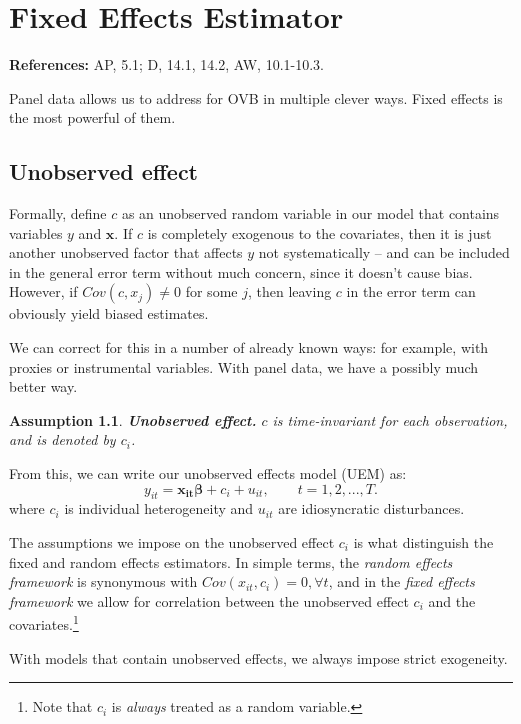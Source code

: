 \documentclass[11pt, a4paper]{report}
\theoremstyle{plain}
\newtheorem{assump}[thm]{Assumption}
\theoremstyle{plain}
\theoremstyle{remark}
\begin{document}
\chapter{Fixed Effects Estimator}

\textbf{References:} AP, 5.1; D, 14.1, 14.2, AW, 10.1-10.3.

Panel data allows us to address for OVB in multiple clever ways. Fixed effects is the most powerful of them.

\section{Unobserved effect}

Formally, define $c$ as an unobserved random variable in our model that contains variables $y$ and $\mathbf{x}$. If $c$ is completely exogenous to the covariates, then it is just another unobserved factor that affects $y$ not systematically -- and can be included in the general error term without much concern, since it doesn't cause bias. However, if $Cov(c,x_j) \neq 0$ for some $j$, then leaving $c$ in the error term can obviously yield biased estimates. 

We can correct for this in a number of already known ways: for example, with proxies or instrumental variables. With panel data, we have a possibly much better way.

\begin{assump}
    \textbf{Unobserved effect.} \label{unobserved_effect} $c$ is time-invariant for each observation, and is denoted by $c_i$.
\end{assump}

From this, we can write our unobserved effects model (UEM) as:
\begin{equation}
    y_{it} = \mathbf{x_{it}\beta} + c_i + u_{it}, \hspace{2em} t = 1,2,...,T.
\end{equation}
where $c_i$ is individual heterogeneity and $u_{it}$ are idiosyncratic disturbances. 

The assumptions we impose on the unobserved effect $c_i$ is what distinguish the fixed and random effects estimators. In simple terms, the \textit{random effects framework} is synonymous with $Cov(x_{it}, c_i) = 0, \forall t$, and in the \textit{fixed effects framework} we allow for correlation between the unobserved effect $c_i$ and the covariates.\footnote{Note that $c_i$ is \textit{always} treated as a random variable.}

With models that contain unobserved effects, we always impose strict exogeneity.
\end{document}

